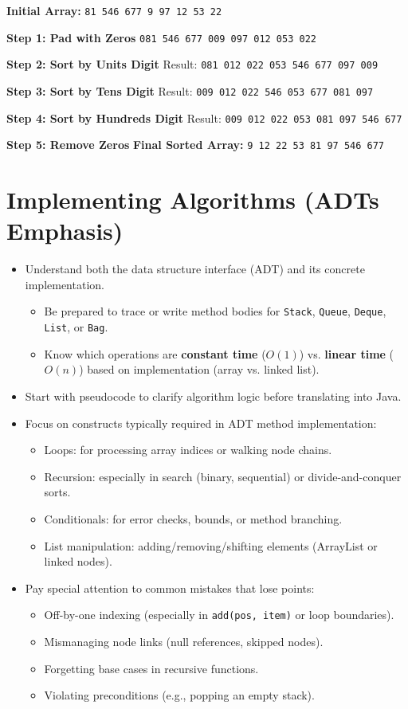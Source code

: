 \documentclass[11pt]{article}
\begin{document}
\textbf{Initial Array:} \verb|81 546 677 9 97 12 53 22|

\textbf{Step 1: Pad with Zeros}  
\verb|081 546 677 009 097 012 053 022|

\textbf{Step 2: Sort by Units Digit}  
Result: \verb|081 012 022 053 546 677 097 009|

\textbf{Step 3: Sort by Tens Digit}  
Result: \verb|009 012 022 546 053 677 081 097|

\textbf{Step 4: Sort by Hundreds Digit}  
Result: \verb|009 012 022 053 081 097 546 677|

\textbf{Step 5: Remove Zeros}  
\textbf{Final Sorted Array:} \verb|9 12 22 53 81 97 546 677|

\newpage
\section*{Implementing Algorithms (ADTs Emphasis)}
\begin{itemize}
  \item Understand both the data structure interface (ADT) and its concrete implementation.
    \begin{itemize}
      \item Be prepared to trace or write method bodies for \texttt{Stack}, \texttt{Queue}, \texttt{Deque}, \texttt{List}, or \texttt{Bag}.
      \item Know which operations are \textbf{constant time} ($O(1)$) vs. \textbf{linear time} ($O(n)$) based on implementation (array vs. linked list).
    \end{itemize}
  \item Start with pseudocode to clarify algorithm logic before translating into Java.
  \item Focus on constructs typically required in ADT method implementation:
    \begin{itemize}
      \item Loops: for processing array indices or walking node chains.
      \item Recursion: especially in search (binary, sequential) or divide-and-conquer sorts.
      \item Conditionals: for error checks, bounds, or method branching.
      \item List manipulation: adding/removing/shifting elements (ArrayList or linked nodes).
    \end{itemize}
  \item Pay special attention to common mistakes that lose points:
    \begin{itemize}
      \item Off-by-one indexing (especially in \texttt{add(pos, item)} or loop boundaries).
      \item Mismanaging node links (null references, skipped nodes).
      \item Forgetting base cases in recursive functions.
      \item Violating preconditions (e.g., popping an empty stack).
    \end{itemize}
\end{itemize}
\end{document}
